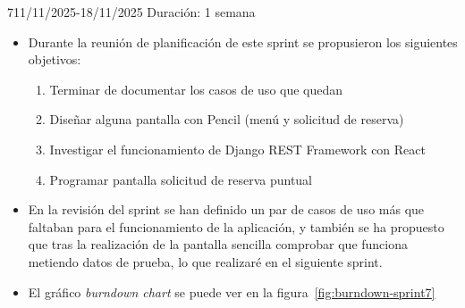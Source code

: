 \begin{Sprint}{7}{11/11/2025-18/11/2025}
	Duración: 1 semana
	\begin{itemize}	
		\item{}
		Durante la reunión de planificación de este sprint se propusieron los siguientes objetivos:
		\begin{enumerate}
			\item Terminar de documentar los casos de uso que quedan
			\item Diseñar alguna pantalla con Pencil (menú y solicitud de reserva)
			\item Investigar el funcionamiento de Django REST Framework con React
			\item Programar pantalla solicitud de reserva puntual
		\end{enumerate}
		\item{}
		En la revisión del sprint se han definido un par de casos de uso más que faltaban para el funcionamiento de la aplicación, y también se ha propuesto que tras la realización de la pantalla sencilla comprobar que funciona metiendo datos de prueba, lo que realizaré en el siguiente sprint.
		\item{} 
		El gráfico \textit{burndown chart} se puede ver en la figura~\ref{fig:burndown-sprint7}
	\end{itemize}
\end{Sprint}

